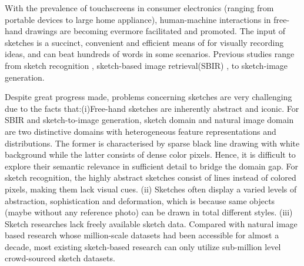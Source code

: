 


{W}{ith} the prevalence of touchscreens in consumer electronics (ranging from portable devices to large home appliance),
 human-machine interactions in free-hand drawings are becoming evermore facilitated and promoted. 
 The input of sketches is a succinct, convenient and efficient means of for visually recording ideas, and can beat hundreds of words in some scenarios. 
 Previous studies range from sketch recognition
  \cite{sketchanet}, sketch-based image retrieval(SBIR) \cite{SaavedraB10,2012sketchhash,Yu2016shoes,SangkloyBHH16,SongYSXH17,EitzHBA10},
  to sketch-image generation. 


Despite great progress made, problems concerning sketches are very challenging due to the facts that:(i)Free-hand sketches are inherently abstract and iconic.
For SBIR and sketch-to-image generation, sketch domain and natural image domain are two distinctive domains with heterogeneous feature representations and distributions. The former is characterised by 
sparse black line drawing with white background while the latter consists of dense color pixels. Hence, it is difficult to explore their semantic 
relevance in sufficient detail to bridge the domain gap. For sketch recognition, the highly abstract sketches consist of lines instead of colored pixels, making them lack visual cues.
(ii) Sketches often display a varied levels of abstraction, sophistication and deformation, which is because same objects (maybe without any reference photo) can be drawn in total different styles. 
(iii) Sketch researches lack freely available sketch data. Compared with natural image based research whose million-scale datasets had been accessible for almost a decade, most existing 
sketch-based research can only utilize sub-million level crowd-sourced sketch datasets.

